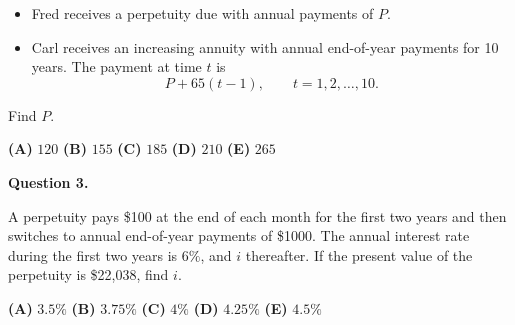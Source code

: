 \documentclass[11pt]{article}
\begin{document}
\begin{itemize}
    \item Fred receives a perpetuity due with annual payments of $P$.
    
    \item Carl receives an increasing annuity with annual end-of-year payments for 10 years. The payment at time $t$ is
    \[
    P + 65(t-1), \qquad t = 1,2,\dots,10.
    \]
\end{itemize}

Find $P$.



\medskip

\begin{center}

\textbf{(A)} $120$
\hspace{1cm}
\textbf{(B)} $155$
\hspace{1cm}
\textbf{(C)} $185$
\hspace{1cm}
\textbf{(D)} $210$
\hspace{1cm}
\textbf{(E)} $265$

\end{center}

\newpage


\textbf{Question 3.}

A perpetuity pays \$100 at the end of each month for the first two years and then switches to annual end-of-year payments of \$1000. The annual interest rate during the first two years is $6\%$, and $i$ thereafter. If the present value of the perpetuity is \$22{,}038, find $i$.
 

\medskip

\begin{center}

\textbf{(A)} $3.5\%$
\hspace{1cm}
\textbf{(B)} $3.75\%$
\hspace{1cm}
\textbf{(C)} $4\%$
\hspace{1cm}
\textbf{(D)} $4.25\%$
\hspace{1cm}
\textbf{(E)} $4.5\%$

\end{center}
\end{document}
